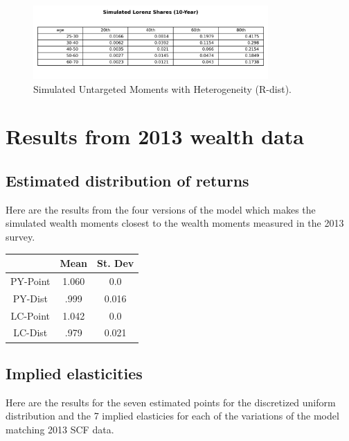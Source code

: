 \begin{figure}[htbp]
\centering
\includegraphics[width=0.8\textwidth]{Tables/Sim_Lorenz_10yr_LCrrDistNetWorth_2010.png}
\caption{Simulated Untargeted Moments with Heterogeneity (R-dist).}
\label{fig:SimLorenzTarDist2010}
\end{figure}


\section{Results from 2013 wealth data}

\subsection{Estimated distribution of returns}

\par Here are the results from the four versions of the model  which makes the simulated wealth moments closest to the wealth moments measured in the 2013 survey.

\begin{center}
    \begin{tabular}{|c|c|c|}
\hline
& Mean & St. Dev \\
\hline
PY-Point & 1.060 & 0.0  \\
PY-Dist & .999  &  0.016  \\
LC-Point & 1.042 & 0.0  \\
LC-Dist & .979  &  0.021 \\
\hline
    \end{tabular}
    \end{center}

\subsection{Implied elasticities}

\par Here are the results for the seven estimated points for the discretized uniform distribution and the 7 implied elasticies for each of the variations of the model matching 2013 SCF data. 


